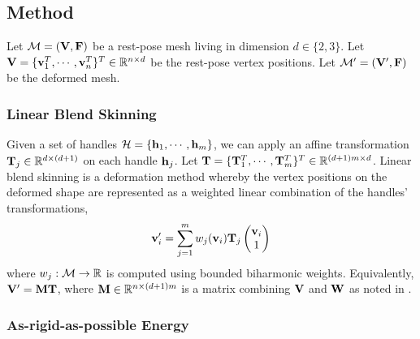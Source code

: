 \subsection*{Method}

Let $\mathcal{M} = (\mathbf{V}, \mathbf{F})$ be a rest-pose mesh living in dimension $d\in\{2,3\}$. Let $\mathbf{V} = \{\mathbf{v}_1^T, \cdots, \mathbf{v}_n^T\}^T \in \mathbb{R}^{n \times d}$ be the rest-pose vertex positions. Let $\mathcal{M}' = (\mathbf{V}', \mathbf{F})$ be the deformed mesh.

\subsubsection*{Linear Blend Skinning}

Given a set of handles $\mathcal{H} = \{ \mathbf{h}_1, \cdots, \mathbf{h}_m \}$, we can apply an affine transformation $\mathbf{T}_j \in \mathbb{R}^{d \times (d+1)}$ on each handle $\mathbf{h}_j$. Let $\mathbf{T} = \{ \mathbf{T}_1^T, \cdots, \mathbf{T}_m^T \}^T \in \mathbb{R}^{(d+1)m \times d}$. Linear blend skinning is a deformation method whereby the vertex positions on the deformed shape are represented as a weighted linear combination of the handles' transformations,
\[
    \mathbf{v}_i' = \sum_{j=1}^m w_j(\mathbf{v}_i) \mathbf{T}_j 
    \begin{pmatrix} 
    \mathbf{v}_i \\
    1 
    \end{pmatrix} 
\]
where $w_j: \mathcal{M} \rightarrow \mathbb{R}$ is computed using bounded biharmonic weights.\cite{jacobson_bounded_biharmonic_weights_2011} Equivalently, $\mathbf{V}' = \mathbf{M} \mathbf{T}$, where $\mathbf{M} \in \mathbb{R}^{n \times (d+1)m}$ is a matrix combining $\mathbf{V}$ and $\mathbf{W}$ as noted in \cite{jacobson_fast_2012}. 





\subsubsection*{As-rigid-as-possible Energy}

